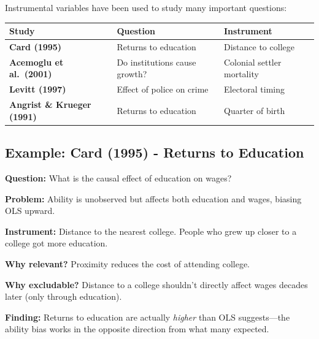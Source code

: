 \documentclass[
  letterpaper,
  DIV=11,
  numbers=noendperiod]{scrreprt}
\newcounter{none} %
\begin{document}
Instrumental variables have been used to study many important questions:

{\def\LTcaptype{none} %
\begin{longtable}[]{@{}
  >{\raggedright\arraybackslash}p{}
  >{\raggedright\arraybackslash}p{}
  >{\raggedright\arraybackslash}p{}@{}}
\toprule\noalign{}
\begin{minipage}[b]{\linewidth}\raggedright
Study
\end{minipage} & \begin{minipage}[b]{\linewidth}\raggedright
Question
\end{minipage} & \begin{minipage}[b]{\linewidth}\raggedright
Instrument
\end{minipage} \\
\midrule\noalign{}
\endhead
\bottomrule\noalign{}
\endlastfoot
\textbf{Card (1995)} & Returns to education & Distance to college \\
\textbf{Acemoglu et al.~(2001)} & Do institutions cause growth? &
Colonial settler mortality \\
\textbf{Levitt (1997)} & Effect of police on crime & Electoral timing \\
\textbf{Angrist \& Krueger (1991)} & Returns to education & Quarter of
birth \\
\end{longtable}
}

\subsection{Example: Card (1995) - Returns to
Education}\label{example-card-1995---returns-to-education}

\textbf{Question:} What is the causal effect of education on wages?

\textbf{Problem:} Ability is unobserved but affects both education and
wages, biasing OLS upward.

\textbf{Instrument:} Distance to the nearest college. People who grew up
closer to a college got more education.

\textbf{Why relevant?} Proximity reduces the cost of attending college.

\textbf{Why excludable?} Distance to a college shouldn't directly affect
wages decades later (only through education).

\textbf{Finding:} Returns to education are actually \emph{higher} than
OLS suggests---the ability bias works in the opposite direction from
what many expected.
\end{document}
